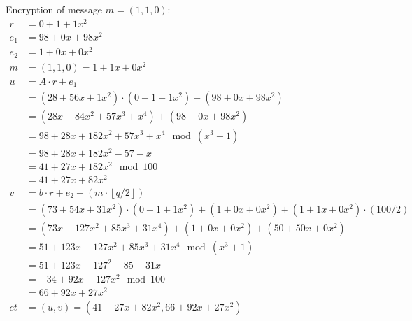 Encryption of message $m=(1,1,0)$:
\begin{align*}
  r   & =0 + 1 + 1x^2                                                                            \\
  e_1 & =98 + 0x + 98x^2                                                                         \\
  e_2 & =1 + 0x + 0x^2                                                                           \\
  m   & = (1, 1, 0) = 1+ 1x+ 0x^2                                                                \\
  u   & = A \cdot r + e_1                                                                        \\
      & = (28 + 56x + 1x^2)\cdot(0 + 1 + 1x^2) + (98 + 0x + 98x^2)                               \\
      & = (28x+84x^2+57x^3+x^4) + (98 + 0x + 98x^2)                                              \\
      & = 98+28x+182x^2+57x^3+x^4 \mod (x^3+1)                                                   \\
      & = 98+28x+182x^2-57-x                                                                     \\
      & = 41+27x+182x^2  \mod 100                                                                \\
      & = 41+27x+82x^2                                                                           \\
  v   & = b \cdot r + e_2 + (m\cdot\left\lfloor q/2\right\rfloor)                                \\
      & = (73 + 54x + 31x^2) \cdot (0 + 1 + 1x^2) + (1 + 0x + 0x^2) +  (1+ 1x+ 0x^2)\cdot(100/2) \\
      & = (73x + 127x^2 + 85x^3 + 31x^4) + (1 + 0x + 0x^2) +  (50+ 50x+ 0x^2)                    \\
      & = 51 + 123x + 127x^2 + 85x^3 + 31x^4 \mod (x^3+1)                                        \\
      & = 51 + 123x + 127^2 - 85 - 31x                                                           \\
      & = -34 + 92x + 127x^2 \mod 100                                                            \\
      & = 66 + 92x + 27x^2                                                                       \\
  ct  & = (u,v) = (41+27x+82x^2, 66 + 92x + 27x^2)                                               \\
\end{align*}

